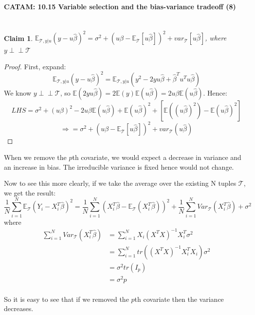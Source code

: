 \documentclass{article}
\newtheorem{claim}[theorem]{Claim}
\newcommand{\indep}{\perp \!\!\! \perp}
\newcommand{\hb}{\hat{\beta}}
\begin{document}
	\begin{center}\LARGE\bf
		CATAM: 10.15 Variable selection and the bias-variance tradeoff (8)
	\end{center}

	\section{}
	
	\begin{claim}
		$ \mathbb{E}_{\mathcal{T}, y|u}(y - u\hat{\beta})^2 = \sigma^2  + (u \beta - \mathbb{E}_{\mathcal{T}}[u \hat{\beta}])^2 + var_{\mathcal{T}}[u \hat{\beta}]$, where $ y \indep \mathcal{T} $
	\end{claim}
	\begin{proof}
		First, expand:
		\[\mathbb{E}_{\mathcal{T}, y|u}(y - u\hat{\beta})^2 = \mathbb{E}_{\mathcal{T}, y|u}(y^2 - 2y u \hat{\beta} + \hat{\beta}^T u^T u \hat{\beta})\]
		We know  $ y \indep \mathcal{T} $, so $ \mathbb{E}(2yu\hat{\beta}) = 2 \mathbb{E}(y)\mathbb{E}(u \hat{\beta}) = 2u\beta \mathbb{E}(u \hat{\beta}) $.
		Hence:
		\[LHS = \sigma^2 + (u \beta)^2 - 2u\beta\mathbb{E}(u \hat{\beta}) + \mathbb{E}(u \hat{\beta})^2 + [\mathbb{E}((u \hat{\beta})^2) - \mathbb{E}(u \hat{\beta})^2] \]
		\[\Rightarrow = \sigma^2 + (u\beta - \mathbb{E}_{\mathcal{T}}[u \hat{\beta}])^2 + var_{\mathcal{T}}(u \hat{\beta})\]
	\end{proof}
	
	When we remove the $ p $th covariate, we would expect a decrease in variance and an increase in bias. The irreducible variance is fixed hence would not change.
	
	Now to see this more clearly, if we take the average over the existing N tuples $ \mathcal{T} $, we get the result:
	\[\frac{1}{N} \sum_{i = 1}^{N} \mathbb{E}_{\mathcal{T}}(Y_i - X_i^T \hb )^2 = \frac{1}{N} \sum_{i = 1}^{N} (X_i^T \hb - \mathbb{E}_{\mathcal{T}}(X_i^T \hb ))^2 + \frac{1}{N} \sum_{i = 1}^{N} Var_{\mathcal{T}}(X_i^T \hb) + \sigma^2 \]
	where
	\begin{align*}
		\sum_{i = 1}^{N} Var_{\mathcal{T}}(X_i^T \hb) &= \sum_{i = 1}^{N} X_i (X^TX)^{-1} X_i^T \sigma^2 \\
		&= \sum_{i = 1}^{N} tr((X^TX)^{-1} X_i^T X_i) \sigma^2\\
		&= \sigma^2 tr(I_p)\\
		&= \sigma^2 p	\\
	\end{align*}

	So it is easy to see that if we removed the $ p $th covariate then the variance decreases.
	
\end{document}
